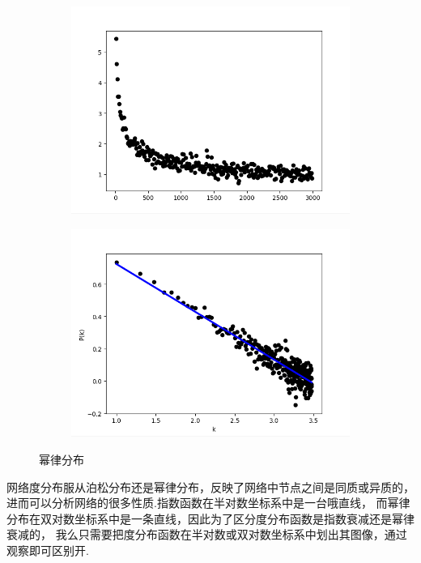 \documentclass[bachelor,adobefonts]{jnuthesis}
\begin{document}
\begin{figure}[h!]
  \centering
    \begin{subfigure}[b]{0.4\linewidth}
      \includegraphics[width=\linewidth]{Wmilv.png}
      \caption{}
    \end{subfigure}
    \begin{subfigure}[b]{0.4\linewidth}
      \includegraphics[width=\linewidth]{WmilvN.png}
      \caption{}
    \end{subfigure}
  \caption{幂律分布}
\end{figure}

网络度分布服从泊松分布还是幂律分布，反映了网络中节点之间是同质或异质的，
进而可以分析网络的很多性质.指数函数在半对数坐标系中是一台哦直线，
而幂律分布在双对数坐标系中是一条直线，因此为了区分度分布函数是指数衰减还是幂律衰减的，
我么只需要把度分布函数在半对数或双对数坐标系中划出其图像，通过观察即可区别开.
\end{document}
